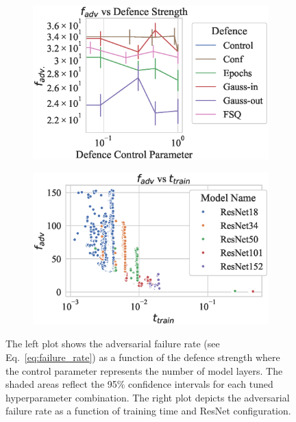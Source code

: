 \begin{figure}[!h]
    \begin{subfigure}
        \centering
        \includegraphics[trim={0 20pt 0 10pt},clip,width=.45\textwidth]{cifar100/def_param_vs_adv_failure_rate.eps}
    \end{subfigure}
    \begin{subfigure}
        \centering
        \includegraphics[trim={0 20pt 0 10pt},clip,width=.45\textwidth]{cifar100/adv_failure_rate_vs_train_time.eps}
    \end{subfigure}
    \caption{The left plot shows the adversarial failure rate (see Eq.~\ref{eq:failure_rate}) as a function of the defence strength where the control parameter represents the number of model layers. The shaded areas reflect the 95\% confidence intervals for each tuned hyperparameter combination. The right plot depicts the adversarial failure rate as a function of training time and ResNet configuration.}
    \label{fig:failure_rate}
\end{figure}

